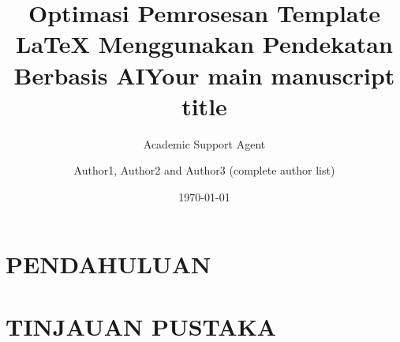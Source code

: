 \documentclass{pnas-new}
\title{Optimasi Pemrosesan Template LaTeX Menggunakan Pendekatan Berbasis AI}
\author{Academic Support Agent}
\date{\today}
\begin{document}
\maketitle

\begin{abstract}

\end{abstract}

\chapter{PENDAHULUAN}


\chapter{TINJAUAN PUSTAKA}




\title{Your main manuscript title}
\author{Author1, Author2 and Author3 (complete author list)}
\end{document}
